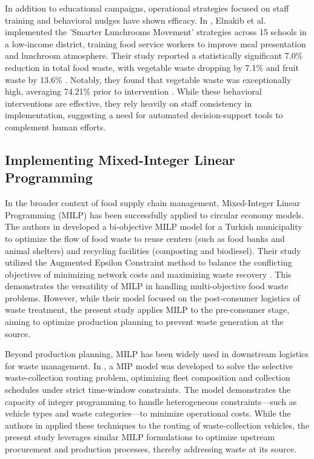 \documentclass[journal]{IEEEtran}
\begin{document}
In addition to educational campaigns, operational strategies focused on staff training and behavioral nudges have shown efficacy. In \cite{elnakib}, Elnakib et al. implemented the 'Smarter Lunchrooms Movement' strategies across 15 schools in a low-income district, training food service workers to improve meal presentation and lunchroom atmosphere. Their study reported a statistically significant 7.0\% reduction in total food waste, with vegetable waste dropping by 7.1\% and fruit waste by 13.6\% \cite{elnakib}. Notably, they found that vegetable waste was exceptionally high, averaging 74.21\% prior to intervention \cite{elnakib}. While these behavioral interventions are effective, they rely heavily on staff consistency in implementation, suggesting a need for automated decision-support tools to complement human efforts.

\subsection{Implementing Mixed-Integer Linear Programming}

In the broader context of food supply chain management, Mixed-Integer Linear Programming (MILP) has been successfully applied to circular economy models. The authors in \cite{kabadurmus} developed a bi-objective MILP model for a Turkish municipality to optimize the flow of food waste to reuse centers (such as food banks and animal shelters) and recycling facilities (composting and biodiesel). Their study utilized the Augmented Epsilon Constraint method to balance the conflicting objectives of minimizing network costs and maximizing waste recovery \cite{kabadurmus}. This demonstrates the versatility of MILP in handling multi-objective food waste problems. However, while their model focused on the post-consumer logistics of waste treatment, the present study applies MILP to the pre-consumer stage, aiming to optimize production planning to prevent waste generation at the source.

Beyond production planning, MILP has been widely used in downstream logistics for waste management. In \cite{korcy}, a MIP model was developed to solve the selective waste-collection routing problem, optimizing fleet composition and collection schedules under strict time-window constraints. The model demonstrates the capacity of integer programming to handle heterogeneous constraints—such as vehicle types and waste categories—to minimize operational costs. While the authors in \cite{korcy} applied these techniques to the routing of waste-collection vehicles, the present study leverages similar MILP formulations to optimize upstream procurement and production processes, thereby addressing waste at its source.
\end{document}
